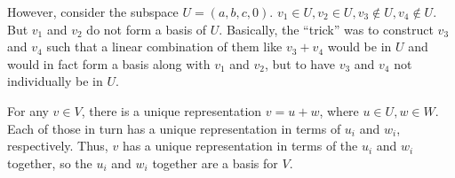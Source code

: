\documentclass{article}
\begin{document}
However, consider the subspace $U = {(a,b,c,0)}$. $v_1 \in U, v_2 \in U, v_3
\notin U, v_4 \notin U$. But $v_1$ and $v_2$ do not form a basis of $U$.
Basically, the ``trick'' was to construct $v_3$ and $v_4$ such that a linear
combination of them like $v_3 + v_4$ would be in $U$ and would in fact form a
basis along with $v_1$ and $v_2$, but to have $v_3$ and $v_4$ not individually
be in $U$.


For any $v \in V$, there is a unique representation $v = u + w$, where $u \in U,
w \in W$. Each of those in turn has a unique representation in terms of $u_i$
and $w_i$, respectively. Thus, $v$ has a unique representation in terms of the
$u_i$ and $w_i$ together, so the $u_i$ and $w_i$ together are a basis for $V$.
\end{document}

